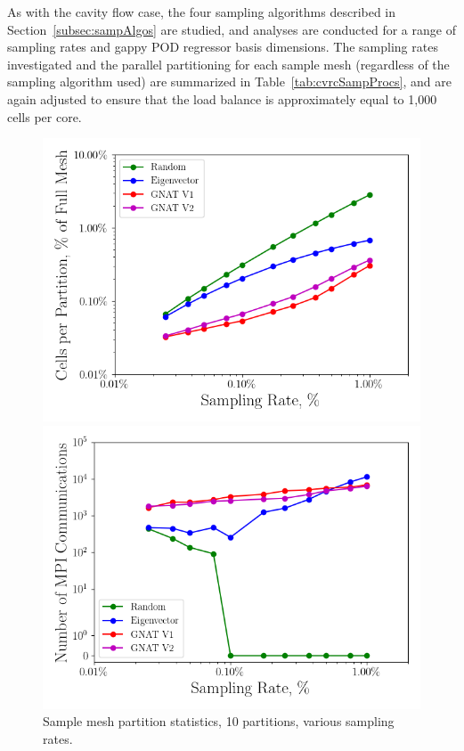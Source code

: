 As with the cavity flow case, the four sampling algorithms described in Section~\ref{subsec:sampAlgos} are studied, and analyses are conducted for a range of sampling rates and gappy POD regressor basis dimensions. The sampling rates investigated and the parallel partitioning for each sample mesh (regardless of the sampling algorithm used) are summarized in Table~\ref{tab:cvrcSampProcs}, and are again adjusted to ensure that the load balance is approximately equal to 1,000 cells per core.

\begin{figure}
	\begin{minipage}{0.49\linewidth}
		\includegraphics[width=0.99\linewidth]{Chapters/HPROMResults/Images/cvrc/deim/stats/cvrc_partition_stats.png}
	\end{minipage}
	\begin{minipage}{0.49\linewidth}
		\includegraphics[width=0.99\linewidth]{Chapters/HPROMResults/Images/cvrc/deim/stats/cvrc_partition_comms.png}
	\end{minipage}
	\caption{Sample mesh partition statistics, 10 partitions, various sampling rates.}
\end{figure}

